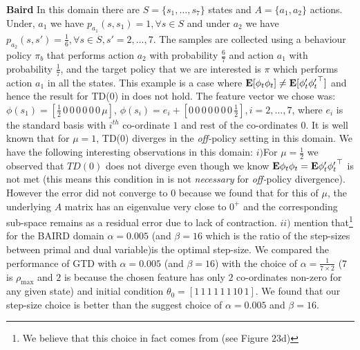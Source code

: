 \textbf{Baird} In this domain there are $S=\{s_1,\ldots,s_7\}$ states and $A=\{a_1,a_2\}$ actions. Under, $a_1$ we have $p_{a_1}(s,s_1)=1, \forall s\in S$ and under $a_2$ we have $p_{a_2}(s,s')=\frac{1}{6}, \forall s\in S, s'=2,\ldots,7$. The samples are collected using a behaviour policy $\pi_b$ that performs action $a_2$ with probability $\frac{6}{7}$ and action $a_1$ with probability $\frac17$, and the target policy that we are interested is $\pi$ which performs action $a_1$ in all the states. This example is a case where $\mathbf{E}[{\phi_t\phi_t}]\neq\mathbf{E}[{\phi'_t{\phi'_t}^\top}]$ and hence the result for TD(0) in  does not hold. The feature vector we chose was: $\phi(s_1)=[\frac{1}{2}\,0\,0\,0\,0\,0\,0\,\mu]$, $\phi(s_i)=e_i+[0\,0\,0\,0\,0\,0\,0\,\frac{1}{2}], i=2,\ldots,7$, where $e_i$ is the standard basis with $i^{th}$ co-ordinate $1$ and rest of the co-ordinates $0$. It is well known that for $\mu=1$, TD(0) diverges in the \emph{off-}policy setting in this domain. We have the following interesting observations in this domain:
$i)$For $\mu=\frac{1}{2}$ we observed that $TD(0)$ does not diverge even though we know $\mathbf{E}{\phi_t\phi_t}=\mathbf{E}{\phi'_t{\phi'_t}^\top}$ is not met (this means this condition in is not \emph{necessary} for \emph{off-}policy divergence). However the error did not converge to $0$ because we found that for this of $\mu$, the underlying $A$ matrix has an eigenvalue very close to $0^+$ and the corresponding sub-space remains as a residual error due to lack of contraction.
$ii)$ \citet{gtdmp} mention that\footnote{We believe that this choice in fact comes from \cite{dann} (see Figure $23$d) } for the BAIRD domain $\alpha=0.005$ (and $\beta=16$ which is the ratio of the step-sizes between primal and dual variable)is the optimal step-size. We compared the performance of GTD with $\alpha=0.005$ (and $\beta=16$) with the choice of $\alpha=\frac{1}{7\times 2}$ ($7$ is $\rho_{\max}$ and $2$ is because the chosen feature has only $2$ co-ordinates non-zero for any given state) and initial condition $\theta_0=[1\, 1\, 1\, 1\, 1\, 1\, 10\, 1]$. We found that our step-size choice is better than the suggest choice of $\alpha=0.005$ and $\beta=16$.



